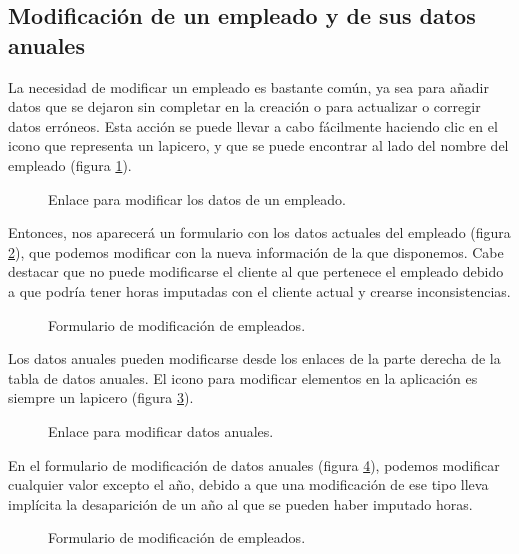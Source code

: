 \subsection{Modificación de un empleado y de sus datos anuales}

La necesidad de modificar un empleado es bastante común, ya sea para añadir
datos que se dejaron sin completar en la creación o para actualizar o corregir
datos erróneos. Esta acción se puede llevar a cabo fácilmente haciendo clic en
el icono que representa un lapicero, y que se puede encontrar al lado del
nombre del empleado (figura \ref{fig:mod_persona}).

\begin{figure}
\centering
{}
\caption{Enlace para modificar los datos de un empleado.}
\label{fig:mod_persona}
\end{figure}

Entonces, nos aparecerá un formulario con los datos actuales del empleado
(figura \ref{fig:form_mod_persona}), que podemos modificar con la nueva
información de la que disponemos. Cabe destacar que no puede modificarse el
cliente al que pertenece el empleado debido a que podría tener horas imputadas
con el cliente actual y crearse inconsistencias.

\begin{figure}
\centering
{}
\caption{Formulario de modificación de empleados.}
\label{fig:form_mod_persona}
\end{figure}

Los datos anuales pueden modificarse desde los enlaces de la parte derecha de
la tabla de datos anuales. El icono para modificar elementos en la aplicación es
siempre un lapicero (figura \ref{fig:mod_anuales}).

\begin{figure}
\centering
{}
\caption{Enlace para modificar datos anuales.}
\label{fig:mod_anuales}
\end{figure}

En el formulario de modificación de datos anuales (figura
\ref{fig:form_mod_anuales}), podemos modificar cualquier valor excepto el año,
debido a que una modificación de ese tipo lleva implícita la desaparición de un
año al que se pueden haber imputado horas. 

\begin{figure}
\centering
{}
\caption{Formulario de modificación de empleados.}
\label{fig:form_mod_anuales}
\end{figure}

